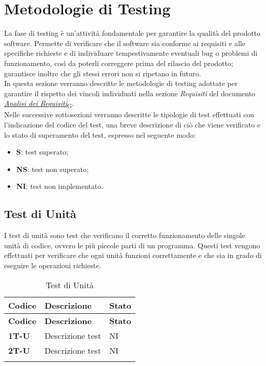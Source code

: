\section{Metodologie di Testing}
La fase di testing è un'attività fondamentale per garantire la qualità del prodotto software. Permette di verificare che il software sia conforme ai requisiti e alle specifiche richieste e di individuare tempestivamente eventuali bug o problemi di funzionamento, così da poterli correggere prima del rilascio del prodotto; garantisce inoltre che gli stessi errori non si ripetano in futuro. \\
In questa sezione verranno descritte le metodologie di testing adottate per garantire il rispetto dei vincoli individuati nella sezione \textit{Requisiti} del documento \href{https://7last.github.io/docs/rtb/documentazione-esterna/analisi-dei-requisiti}{\href{https://7last.github.io/docs/rtb/documentazione-interna/glossario\#analisi-dei-requisiti}{\textit{Analisi dei Requisiti}\textsubscript{G}}}. \\ %
Nelle successive sottosezioni verranno descritte le tipologie di test effettuati con l'indicazione del codice del test, una breve descrizione di ciò che viene verificato e lo stato di superamento del test, espresso nel seguente modo: \\
\begin{itemize}
    \item \textbf{S}: test superato;
    \item \textbf{NS}: test non superato;
    \item \textbf{NI}: test non implementato.
\end{itemize}

\subsection{Test di Unità}
I test di unità sono test che verificano il corretto funzionamento delle singole unità di codice, ovvero le più piccole parti di un programma. Questi test vengono effettuati per verificare che ogni unità funzioni correttamente e che sia in grado di eseguire le operazioni richieste. \\
\begin{longtable}{|>{\raggedright\arraybackslash}m{}|>{\raggedright\arraybackslash}m{}|>{\raggedright\arraybackslash}m{}|}
	\hline
	\textbf{Codice} & \textbf{Descrizione} & \textbf{Stato} \\
	\hline
	\endfirsthead
	\hline
	\textbf{Codice} & \textbf{Descrizione} & \textbf{Stato} \\
	\endhead
	\textbf{1T-U}   & Descrizione test     & NI             \\
	\hline
	\textbf{2T-U}   & Descrizione test     & NI             \\
	\hline
	\caption{Test di Unità} %
	\label{table:12}
\end{longtable}

